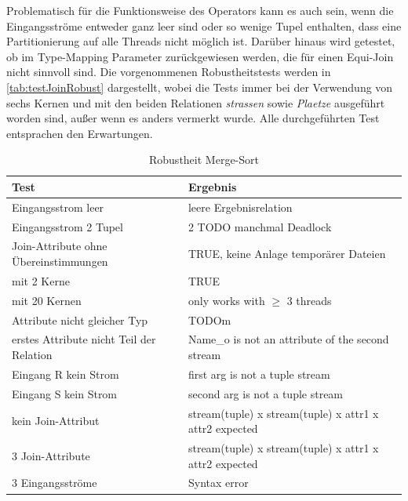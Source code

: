 \documentclass[a4paper,12pt,twoside]{article}
\newcommand{\Fb}[1]{\textit{#1}} %
\begin{document}
{Problematisch für die Funktionsweise des Operators kann es auch sein, wenn die Eingangsströme entweder ganz leer sind oder so wenige Tupel enthalten, dass eine Partitionierung auf alle Threads nicht möglich ist. Darüber hinaus wird getestet, ob im Type-Mapping Parameter zurückgewiesen werden, die für einen Equi-Join nicht sinnvoll sind. Die vorgenommenen Robustheitstests werden in \autoref{tab:testJoinRobust} dargestellt, wobei die Tests immer bei der Verwendung von sechs Kernen und mit den beiden Relationen \Fb{strassen} sowie \Fb{Plaetze} ausgeführt worden sind, außer wenn es anders vermerkt wurde. Alle durchgeführten Test entsprachen den Erwartungen.

\begin{table}
	\centering
	\begin{tabular}{|p{7.5cm}|p{7.5cm}|}
		\hline 
		Test & Ergebnis \\
		\hline
		Eingangsstrom leer & leere Ergebnisrelation \\ 
		\hline
		Eingangsstrom 2 Tupel & 2 TODO manchmal Deadlock \\ 
		\hline
		Join-Attribute ohne Übereinstimmungen & TRUE, keine Anlage temporärer Dateien \\
		\hline
		mit 2 Kerne & TRUE  \\
		\hline
		mit 20 Kernen & only works with $\geq$ 3 threads  \\ 
		\hline
		Attribute nicht gleicher Typ & TODOm \\ 
		\hline
		erstes Attribute nicht Teil der Relation & Name\_o is not an attribute of the second stream \\ 
		\hline
		Eingang R kein Strom & first arg is not a tuple stream \\ 
		\hline
		Eingang S kein Strom & second arg is not a tuple stream \\ 
		\hline
		kein Join-Attribut & stream(tuple) x stream(tuple) x attr1 x attr2 expected \\ 
		\hline
		3 Join-Attribute & stream(tuple) x stream(tuple) x attr1 x attr2 expected \\
		\hline
		3 Eingangsströme &  Syntax error \\
		\hline
	\end{tabular}
	\caption{\label{tab:testJoinRobust}Robustheit Merge-Sort}
\end{table}

}
\end{document}
